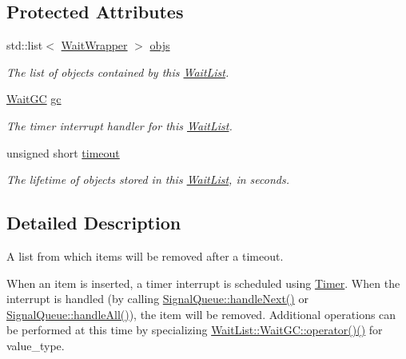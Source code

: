 \subsection*{\-Protected \-Attributes}
\begin{DoxyCompactItemize}
\item 
std\-::list$<$ \hyperlink{classLibWheel_1_1WaitList_1_1WaitWrapper}{\-Wait\-Wrapper} $>$ \hyperlink{classLibWheel_1_1WaitList_a33add3411131d6588693cb4d382f678e}{objs}
\begin{DoxyCompactList}\small\item\em \-The list of objects contained by this \hyperlink{classLibWheel_1_1WaitList}{\-Wait\-List}. \end{DoxyCompactList}\item 
\hyperlink{classLibWheel_1_1WaitList_1_1WaitGC}{\-Wait\-G\-C} \hyperlink{classLibWheel_1_1WaitList_a0c5c6a51b01bb3b575fcd367c8d16f14}{gc}
\begin{DoxyCompactList}\small\item\em \-The timer interrupt handler for this \hyperlink{classLibWheel_1_1WaitList}{\-Wait\-List}. \end{DoxyCompactList}\item 
unsigned short \hyperlink{classLibWheel_1_1WaitList_a53c2d486c7c8a16a7c25176a974b9759}{timeout}
\begin{DoxyCompactList}\small\item\em \-The lifetime of objects stored in this \hyperlink{classLibWheel_1_1WaitList}{\-Wait\-List}, in seconds. \end{DoxyCompactList}\end{DoxyCompactItemize}


\subsection{\-Detailed \-Description}
\-A list from which items will be removed after a timeout. 

\-When an item is inserted, a timer interrupt is scheduled using \hyperlink{classLibWheel_1_1Timer}{\-Timer}. \-When the interrupt is handled (by calling \hyperlink{classLibWheel_1_1SignalQueue_a991ba21066232f0db7be5f21e39edc41}{\-Signal\-Queue\-::handle\-Next()} or \hyperlink{classLibWheel_1_1SignalQueue_ad308bc4818a9d864bc0eb7b4dd1490ae}{\-Signal\-Queue\-::handle\-All()}), the item will be removed. \-Additional operations can be performed at this time by specializing \hyperlink{classLibWheel_1_1WaitList_1_1WaitGC_afb5c536ce88b8c365753e2e491135f55}{\-Wait\-List\-::\-Wait\-G\-C\-::operator()()} for value\-\_\-type.


